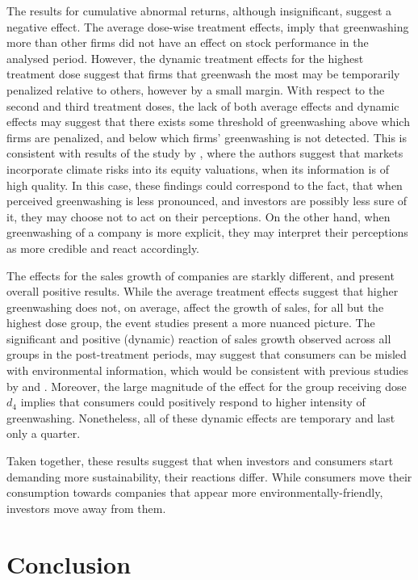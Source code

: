 \documentclass[12pt]{article}
\begin{document}
The results for cumulative abnormal returns, although insignificant, suggest a negative effect. The average dose-wise treatment effects, imply that greenwashing more than other firms did not have an effect on stock performance in the analysed period. However, the dynamic treatment effects for the highest treatment dose suggest that firms that greenwash the most may be temporarily penalized relative to others, however by a small margin. With respect to the second and third treatment doses, the lack of both average effects and dynamic effects may suggest that there exists some threshold of greenwashing above which firms are penalized, and below which firms' greenwashing is not detected. This is consistent with results of the study by \textcite{ilhanClimateRiskDisclosure2023}, where the authors suggest that markets incorporate climate risks into its equity valuations, when its information is of high quality. In this case, these findings could correspond to the fact, that when perceived greenwashing is less pronounced, and investors are possibly less sure of it, they may choose not to act on their perceptions. On the other hand, when greenwashing of a company is more explicit, they may interpret their perceptions as more credible and react accordingly.


The effects for the sales growth of companies are starkly different, and present overall positive results. While the average treatment effects suggest that higher greenwashing does not, on average, affect the growth of sales, for all but the highest dose group, the event studies present a more nuanced picture. The significant and positive (dynamic) reaction of sales growth observed across all groups in the post-treatment periods, may suggest that consumers can be misled with environmental information, which would be consistent with previous studies by \citeauthor{schmuckMisleadingConsumersGreen2018} and \citeauthor{parguelCanEvokingNature2015}. Moreover, the large magnitude of the effect for the group receiving dose $d_4$ implies that consumers could positively respond to higher intensity of greenwashing. Nonetheless, all of these dynamic effects are temporary and last only a quarter.

Taken together, these results suggest that when investors and consumers start demanding more sustainability, their reactions differ. While consumers move their consumption towards companies that appear more environmentally-friendly, investors move away from them. 

\newpage
\section{Conclusion}\label{sect:discussion}
\end{document}
